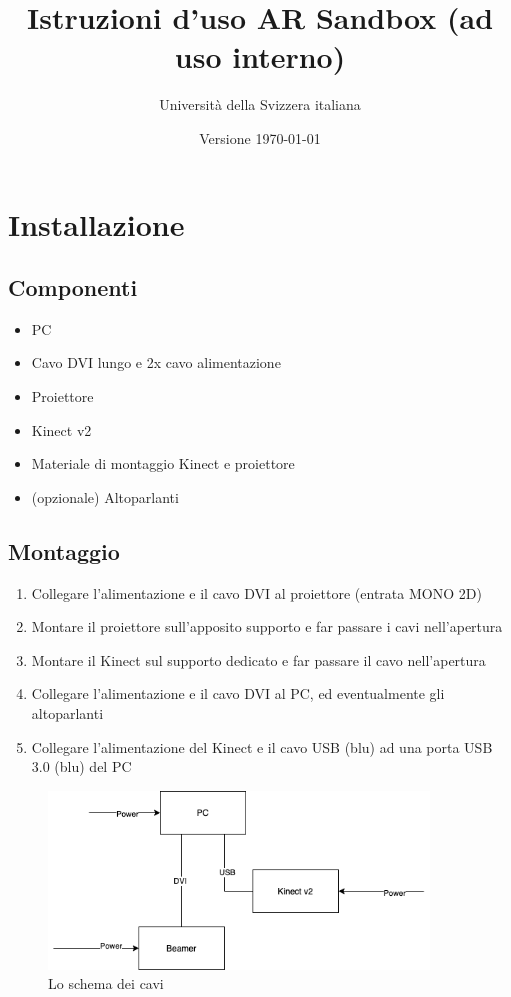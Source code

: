 \documentclass[12pt]{article}
\title{Istruzioni d'uso AR Sandbox (ad uso interno)}
\author{Università della Svizzera italiana}
\date{Versione \today}
\begin{document}
\maketitle
\tableofcontents
\newpage


\section{Installazione}\label{installation}	

	\subsection{Componenti}
	
		\begin{itemize}
			\item PC
			\item Cavo DVI lungo e 2x cavo alimentazione
			\item Proiettore
			\item Kinect v2
			\item Materiale di montaggio Kinect e proiettore
			\item (opzionale) Altoparlanti
		\end{itemize}
		
		
	\subsection{Montaggio}
	
		\begin{enumerate}
			\item Collegare l'alimentazione e il cavo DVI al proiettore (entrata MONO 2D)
			\item Montare il proiettore sull'apposito supporto e far passare i cavi
			nell'apertura
			\item Montare il Kinect sul supporto dedicato e far passare il cavo nell'apertura
			\item Collegare l'alimentazione e il cavo DVI al PC, ed eventualmente gli altoparlanti
			\item Collegare l'alimentazione del Kinect e il cavo USB (blu) ad una porta USB 3.0 (blu) del PC
		\end{enumerate}

		\begin{figure}[H]
			\centering
			\includegraphics[width=0.9\textwidth]{img/cablesScheme.png}
			\caption*{Lo schema dei cavi}
		\end{figure}
\end{document}
